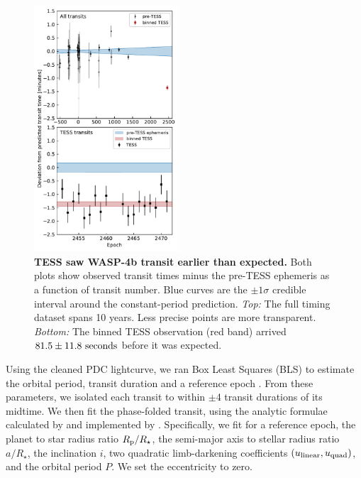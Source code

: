 \documentclass[12pt,twocolumn,tighten]{aastex62}
\begin{document}
\begin{figure}[t]
    \begin{center}
        \leavevmode
        \includegraphics[width=0.48\textwidth]{f3.pdf}
    \end{center}
    \vspace{-0.6cm}
    \caption{
        {\bf TESS saw WASP-4b transit earlier than expected.} Both
        plots show observed transit times minus the pre-TESS ephemeris
        as a function of transit number.  Blue curves are the $\pm
        1\sigma$ credible interval around the constant-period
        prediction.  {\it Top:} The full timing dataset spans 10
        years.  Less precise points are more transparent.  {\it
        Bottom:} The binned TESS observation (red band) arrived $81.5
        \pm 11.8\ {\rm seconds}$ before it was expected.
        \label{fig:arrived_early}
    }
\end{figure}

Using the cleaned PDC lightcurve, we ran Box Least Squares (BLS) to
estimate the orbital period, transit duration and a reference epoch
\citep{kovacs_box-fitting_2002}.  From these parameters, we isolated
each transit to within $\pm$4 transit durations of its midtime.  We
then fit the phase-folded transit, using the analytic formulae
calculated by \citet{mandel_analytic_2002} and implemented by
\citet{kreidberg_batman_2015}.  Specifically, we fit for a reference
epoch, the planet to star radius ratio $R_{\rm p}/R_\star$, the
semi-major axis to stellar radius ratio $a/R_\star$, the inclination
$i$, two quadratic limb-darkening coefficients $(u_{\rm linear},
u_{\rm quad})$, and the orbital period $P$.  We set the eccentricity
to zero. 
\end{document}
